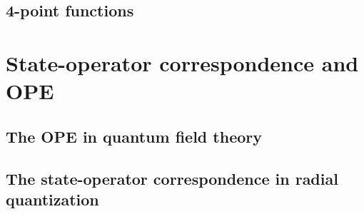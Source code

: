 \documentclass[a4paper,12pt]{article}
\numberwithin{equation}{section}
\begin{document}
\subsection{4-point functions}

%
%
%



\section{State-operator correspondence and OPE}
\label{sec:OPE}


%
%


%
%


\subsection{The OPE in quantum field theory}
%
%
%
%
%
%
%
%
%
%


\subsection{The state-operator correspondence in radial quantization}
\end{document}
